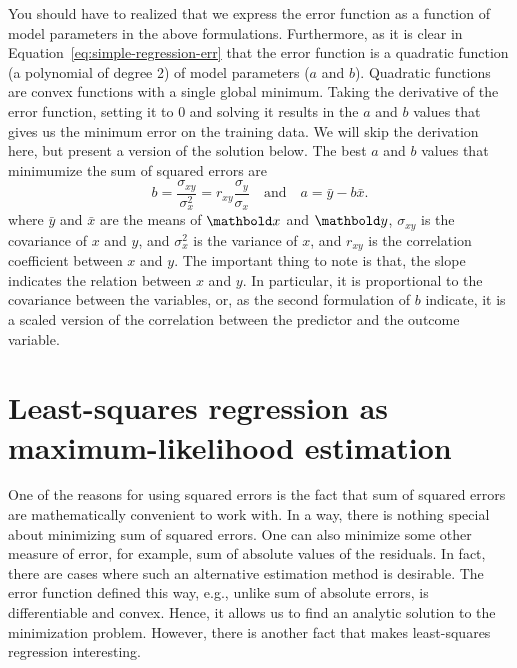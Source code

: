 You should have to realized that
we express the error function as a function of model parameters
in the above formulations.
Furthermore,
as it is clear in Equation~\ref{eq:simple-regression-err} that
the error function is a quadratic function (a polynomial of degree 2)
of model parameters ($a$ and $b$).
Quadratic functions are convex functions with a single global minimum.
Taking the derivative of the error function,
setting it to \num{0} and solving it results
in the $a$ and $b$ values that gives us the minimum error on the training data.
We will skip the derivation here,
but present a version of the solution below.
The best $a$ and $b$ values that minimumize the sum of squared errors are
\begin{equation*}
  b = \frac{\sigma_{xy}}{\sigma_{x}^{2}}
    = r_{xy}\frac{\sigma_{y}}{\sigma_{x}}\quad \text{and}\quad
  a = \bar{y} - b \bar{x} .
\end{equation*}
where $\bar{y}$ and $\bar{x}$ are the means of $\vect{x}$ and $\vect{y}$,
$\sigma_{xy}$ is the covariance of $x$ and $y$,
and $\sigma_{x}^{2}$ is the variance of $x$,
and $r_{xy}$ is the correlation coefficient between $x$ and $y$.
The important thing to note is that,
the slope indicates the relation between $x$ and $y$.
In particular, it is proportional to the covariance between the variables,
or, as the second formulation of $b$ indicate,
it is a scaled version of the correlation
between the predictor and the outcome variable.

\section{Least-squares regression as maximum-likelihood estimation}

One of the reasons for using squared errors is the fact that
sum of squared errors are mathematically convenient to work with.
In a way,
there is nothing special about minimizing sum of squared errors.
One can also minimize some other measure of error,
for example, sum of absolute values of the residuals.
In fact, there are cases
where such an alternative estimation method is desirable.%
The error function defined this way,
e.g., unlike sum of absolute errors,
is differentiable and convex.
Hence,
it allows us to find an analytic solution to the minimization problem.
However,
there is another fact that makes least-squares regression interesting.

